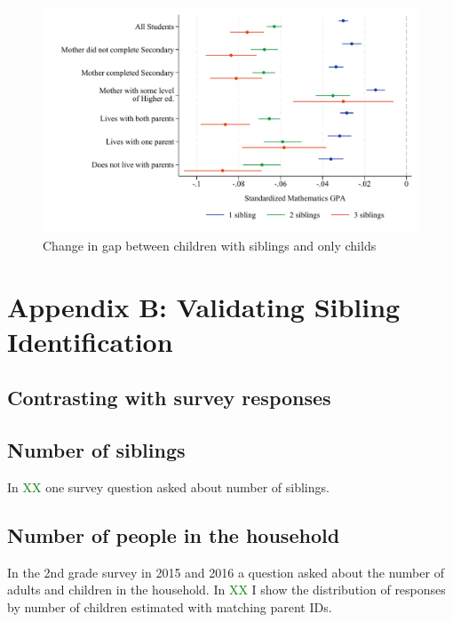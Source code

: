 \begin{figure}[htbp]
    \centering
    
        \includegraphics[width=\textwidth]{./FIGURES/TWFE/covid_twfe_D_bysibs_elm_all_gpa_m_adj_Tsiblings_Soldest_4.pdf}
        \caption{Change in gap between children with siblings and only childs}
        \label{fig:fig_appD}

\end{figure}

\clearpage

\section*{Appendix B: Validating Sibling Identification} \label{sec:appB}

\subsection{Contrasting with survey responses}


\subsection{Number of siblings}

In \textcolor{green}{XX} one survey question asked about number of siblings.


\subsection{Number of people in the household}

In the 2nd grade survey in 2015 and 2016 a question asked about the number of adults and children in the household. In \textcolor{green}{XX} I show the distribution of responses by number of children estimated with matching parent IDs. 

\newpage